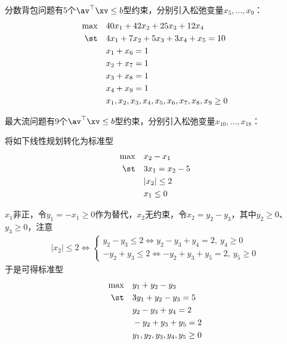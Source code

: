 \documentclass{ctexart}
\begin{document}
\begin{example}  \label{exam: bag-standard}
    分数背包问题有$5$个$\av^\top \xv \le b$型约束，分别引入松弛变量$x_5, \ldots, x_9$：
    \begin{align*}
        \max \quad & 40 x_1 + 42 x_2 + 25 x_3 + 12 x_4                 \\
        \st \quad  & 4 x_1 + 7 x_2 + 5 x_3 + 3 x_4 + x_5 = 10          \\
                   & x_1 + x_6 = 1                                     \\
                   & x_2 + x_7 = 1                                     \\
                   & x_3 + x_8 = 1                                     \\
                   & x_4 + x_9 = 1                                     \\
                   & x_1, x_2, x_3, x_4, x_5, x_6, x_7, x_8, x_9 \ge 0
    \end{align*}

    最大流问题有$9$个$\av^\top \xv \le b$型约束，分别引入松弛变量$x_{10}, \ldots, x_{18}$：
\end{example}

\begin{example}
    将如下线性规划转化为标准型
    \begin{align*}
        \max \quad & x_2 - x_1       \\
        \st  \quad & 3 x_1 = x_2 - 5 \\
                   & |x_2| \le 2     \\
                   & x_1 \le 0
    \end{align*}

    $x_1$非正，令$y_1 = -x_1 \ge 0$作为替代，$x_2$无约束，令$x_2 = y_2 - y_3$，其中$y_2 \ge 0 $、$y_3 \ge 0$，注意
    \begin{align*}
        |x_2| \le 2 \Longleftrightarrow
        \begin{cases}
            y_2 - y_3 \le 2 \Longleftrightarrow y_2 - y_3 + y_4 = 2, ~ y_4 \ge 0 \\
            -y_2 + y_3 \le 2 \Longleftrightarrow -y_2 + y_3 + y_5 = 2, ~ y_5 \ge 0
        \end{cases}
    \end{align*}
    于是可得标准型
    \begin{align*}
        \max \quad & y_1 + y_2 - y_3           \\
        \st  \quad & 3 y_1 + y_2 - y_3 = 5     \\
                   & y_2 - y_3 + y_4 = 2       \\
                   & -y_2 + y_3 + y_5 = 2      \\
                   & y_1,y_2,y_3,y_4,y_5 \ge 0
    \end{align*}
\end{example}
\end{document}
